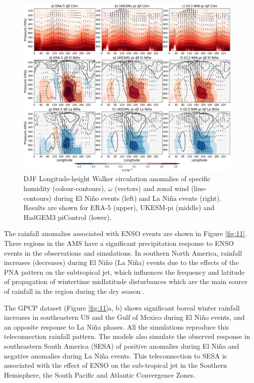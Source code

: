 \begin{figure}
\includegraphics[width=\linewidth]{figures/walkerfinal}
\caption[Walker circulation anomalies associated with ENSO]{DJF Longitude-height Walker circulation anomalies of specific humidity (colour-contours), $\omega$ (vectors) and zonal wind (line-contours) during El Niño events (left) and La Niña events (right). Results are shown for ERA-5 (upper), UKESM-pi (middle) and HadGEM3 piControl (lower).}
\label{fig:swalker}
\end{figure}


The rainfall anomalies associated with ENSO events are shown in Figure \ref{fig:11}. Three regions in the AMS have a significant precipitation response to ENSO events in the observations and simulations.
In southern North America, rainfall increases (decreases) during El Ni\~no (La Ni\~na) events due to the effects of the PNA pattern on the subtropical jet, which influences the frequency and latitude of propagation of wintertime midlatitude disturbances which are the main source of rainfall in the region during the dry season \citep{vera2006,bayr2019}.


The GPCP dataset (Figure \ref{fig:11}a, b) shows significant boreal winter rainfall increases in southeastern US and the Gulf of Mexico during El Ni\~no events, and an opposite response to La Ni\~na phases. All the simulations reproduce this teleconnection rainfall pattern. 
The models also simulate the observed response in southeastern South America (SESA) of positive anomalies during El Ni\~no and negative anomalies during La Ni\~na events. This teleconnection to SESA is associated with the effect of ENSO on the sub-tropical jet in the Southern Hemisphere, the South Pacific and Atlantic Convergence Zones.

